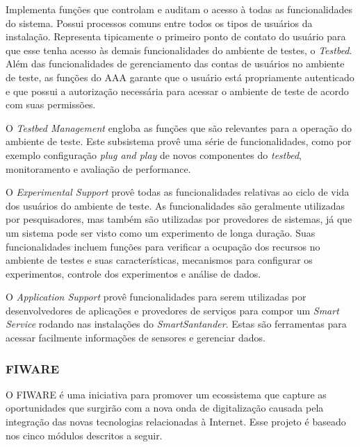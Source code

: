 Implementa funções que controlam e auditam o acesso à todas as funcionalidades do sistema. Possui processos
comuns entre todos os tipos de usuários da instalação. Representa tipicamente o primeiro ponto de contato
do usuário para que esse tenha acesso às demais funcionalidades do ambiente de testes, o \textit{Testbed}.
Além das funcionalidades de gerenciamento das contas de usuários no ambiente de teste, as funções
do AAA garante que o usuário está propriamente autenticado e que possui a autorização necessária para
acessar o ambiente de teste de acordo com suas permissões.

O \textit{Testbed Management} engloba as funções que são relevantes para a operação do ambiente de teste.
Este subsistema provê uma série de funcionalidades, como por exemplo configuração \textit{plug and play}
de novos componentes do \textit{testbed}, monitoramento e avaliação de performance.


O \textit{Experimental Support} provê todas as funcionalidades relativas ao ciclo de vida dos usuários
do ambiente de teste. As funcionalidades são geralmente utilizadas por pesquisadores, mas também são utilizadas por
provedores de sistemas, já que um sistema pode ser visto como um experimento de longa duração.
Suas funcionalidades incluem funções para verificar a ocupação dos recursos no ambiente de testes e suas características,
mecanismos para configurar os experimentos, controle dos experimentos e análise de dados.

O \textit{Application Support} provê funcionalidades para serem utilizadas por desenvolvedores de aplicações
e provedores de serviços para compor um \textit{Smart Service} rodando nas instalações do \textit{SmartSantander}.
Estas são ferramentas para acessar facilmente informações de sensores e gerenciar dados.


\subsubsection{FIWARE}
\label{subsec:FIWARE}
O FIWARE é uma iniciativa para promover um ecossistema que capture as oportunidades que surgirão com a nova onda
de digitalização causada pela integração das novas tecnologias relacionadas à Internet. Esse projeto é
baseado nos cinco módulos descritos a seguir.

